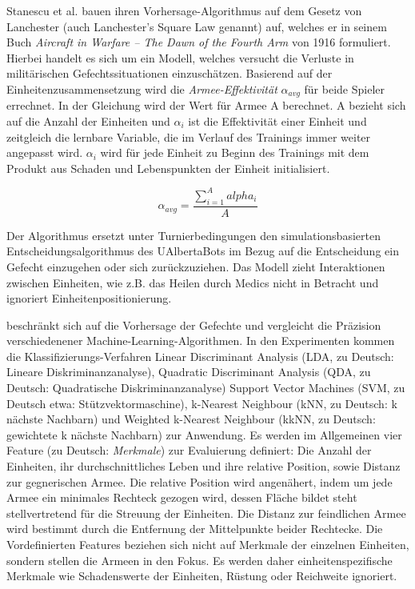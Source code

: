 Stanescu et al. \textcite{AIIDE1511531} bauen ihren Vorhersage-Algorithmus auf dem Gesetz von Lanchester (auch Lanchester's Square Law genannt) auf, welches er in seinem Buch \textit{ Aircraft in Warfare – The Dawn of the Fourth Arm} von 1916 formuliert. Hierbei handelt es sich um ein Modell, welches versucht die Verluste in militärischen Gefechtssituationen  einzuschätzen. Basierend auf der Einheitenzusammensetzung wird die \textit{Armee-Effektivität} $\alpha_{avg}$ für beide Spieler errechnet. In der Gleichung wird der Wert für Armee A berechnet. A bezieht sich auf die Anzahl der Einheiten und $\alpha_i$ ist die Effektivität einer Einheit und zeitgleich die lernbare Variable, die im Verlauf des Trainings immer weiter angepasst wird. $\alpha_i$ wird für jede Einheit zu Beginn des Trainings mit dem Produkt aus Schaden und Lebenspunkten der Einheit initialisiert.

\begin{equation}
	\alpha_{avg} = \frac{\sum_{i=1}^A alpha_i}{A}
\end{equation}

Der Algorithmus ersetzt unter Turnierbedingungen den simulationsbasierten Entscheidungsalgorithmus des UAlbertaBots im Bezug auf die Entscheidung ein Gefecht einzugehen oder sich zurückzuziehen. Das Modell zieht Interaktionen zwischen Einheiten, wie z.B. das Heilen durch Medics nicht in Betracht und ignoriert Einheitenpositionierung.  

\textcite{SnchezRuizGranados2015PredictingTO} beschränkt sich auf die Vorhersage der Gefechte und vergleicht die Präzision verschiedenener Machine-Learning-Algorithmen. In den Experimenten kommen die Klassifizierungs-Verfahren Linear Discriminant Analysis (LDA, zu Deutsch: Lineare Diskriminanzanalyse), Quadratic Discriminant Analysis (QDA, zu Deutsch: Quadratische Diskriminanzanalyse) Support Vector Machines (SVM, zu Deutsch etwa: Stützvektormaschine), k-Nearest Neighbour (kNN, zu Deutsch: k nächste Nachbarn) und Weighted k-Nearest Neighbour (kkNN, zu Deutsch: gewichtete k nächste Nachbarn) zur Anwendung. Es werden im Allgemeinen vier Feature (zu Deutsch: \textit{Merkmale}) zur Evaluierung definiert: Die Anzahl der Einheiten, ihr durchschnittliches Leben und ihre relative Position, sowie Distanz zur gegnerischen Armee. Die relative Position wird angenähert, indem um jede Armee ein minimales Rechteck gezogen wird, dessen Fläche bildet steht stellvertretend für die Streuung der Einheiten. Die Distanz zur feindlichen Armee wird bestimmt durch die Entfernung der Mittelpunkte beider Rechtecke. Die Vordefinierten Features beziehen sich nicht auf Merkmale der einzelnen Einheiten, sondern stellen die Armeen in den Fokus. Es werden daher einheitenspezifische Merkmale wie Schadenswerte der Einheiten, Rüstung oder Reichweite ignoriert.

